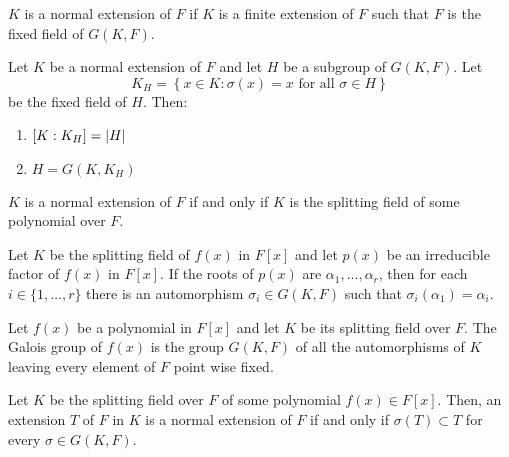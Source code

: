 \begin{definition}\label{def:normal-extension}
	$K$ is a normal extension of $F$ if $K$ is a finite extension of $F$ such that $F$ is the fixed field of $G(K,F)$.
\end{definition}

\begin{theorem}\label{thm:on-the-subfield-subgroup-correspondence}
	Let $K$ be a normal extension of $F$ and let $H$ be a subgroup of $G(K,F)$. Let
	\[
		K_{H}=\left\{{x}\in{K}:\sigma(x)=x\text{ for all }{\sigma}\in{H}\right\}
	\]
	be the fixed field of $H$. Then:
	\begin{enumerate}
		\item $[K:K_{H}]=\lvert H\rvert$
		\item $H=G(K,K_{H})$
	\end{enumerate}
\end{theorem}

\begin{theorem}\label{thm:a-characterization-of-normality}
	$K$ is a normal extension of $F$ if and only if $K$ is the splitting field of some polynomial over $F$.
\end{theorem}

\begin{lemma}\label{lem:the-action-of-the-galois-group-of-a-normal-extension-is-transitive}
	Let $K$ be the splitting field of $f(x)$ in $F[x]$ and let $p(x)$ be an irreducible factor of $f(x)$ in $F[x]$. If the roots of $p(x)$ are $\alpha_{1},\ldots,\alpha_{r}$, then for each ${i}\in\{1,\ldots,r\}$ there is an automorphism ${\sigma_{i}}\in{G(K,F)}$ such that $\sigma_{i}(\alpha_{1})=\alpha_{i}$.
\end{lemma}

\begin{definition}\label{def:galois-group}
	Let $f(x)$ be a polynomial in $F[x]$ and let $K$ be its splitting field over $F$. The Galois group of $f(x)$ is the group $G(K,F)$ of all the automorphisms of $K$ leaving every element of $F$ point wise fixed.
\end{definition}

\begin{lemma}\label{lem:another-characterization-of-normality}
	Let $K$ be the splitting field over $F$ of some polynomial ${f(x)}\in{F[x]}$. Then, an extension $T$ of $F$ in $K$ is a normal extension of $F$ if and only if $\sigma(T)\subset{T}$ for every ${\sigma}\in{G(K,F)}$.
\end{lemma}

